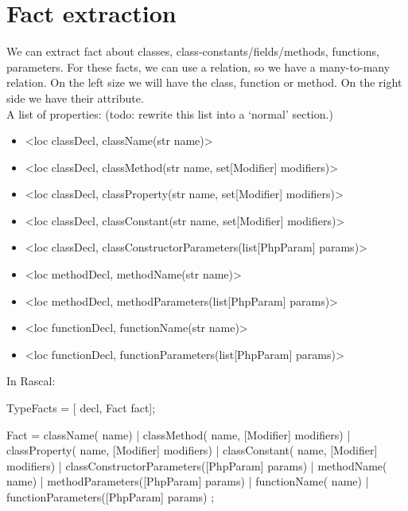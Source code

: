 \documentclass[../main.tex]{subfiles}
\begin{document}
    \section{Fact extraction}
    We can extract fact about classes, class-constants/fields/methods, functions, parameters.
    For these facts, we can use a relation, so we have a many-to-many relation.
    On the left size we will have the class, function or method. On the right side we have their attribute.
    \\
    A list of properties: (todo: rewrite this list into a `normal' section.) %
    \begin{itemize}
        \item \textless{}loc classDecl, className(str name)\textgreater{}
        \item \textless{}loc classDecl, classMethod(str name, set[Modifier] modifiers)\textgreater{}
        \item \textless{}loc classDecl, classProperty(str name, set[Modifier] modifiers)\textgreater{}
        \item \textless{}loc classDecl, classConstant(str name, set[Modifier] modifiers)\textgreater{}
        \item \textless{}loc classDecl, classConstructorParameters(list[PhpParam] params)\textgreater{}
        
        \item \textless{}loc methodDecl, methodName(str name)\textgreater{}
        \item \textless{}loc methodDecl, methodParameters(list[PhpParam] params)\textgreater{}
        
        \item \textless{}loc functionDecl, functionName(str name)\textgreater{}
        \item \textless{}loc functionDecl, functionParameters(list[PhpParam] params)\textgreater{}
    \end{itemize}
    
    In Rascal:
    \begin{rascal}
 TypeFacts = [ decl, Fact fact];

 Fact
    = className( name) 
    | classMethod( name, [Modifier] modifiers)
    | classProperty( name, [Modifier] modifiers)
    | classConstant( name, [Modifier] modifiers)
    | classConstructorParameters([PhpParam] params)
    | methodName( name) 
    | methodParameters([PhpParam] params)
    | functionName( name) 
    | functionParameters([PhpParam] params)
    ;
    \end{rascal}
    
\end{document}
